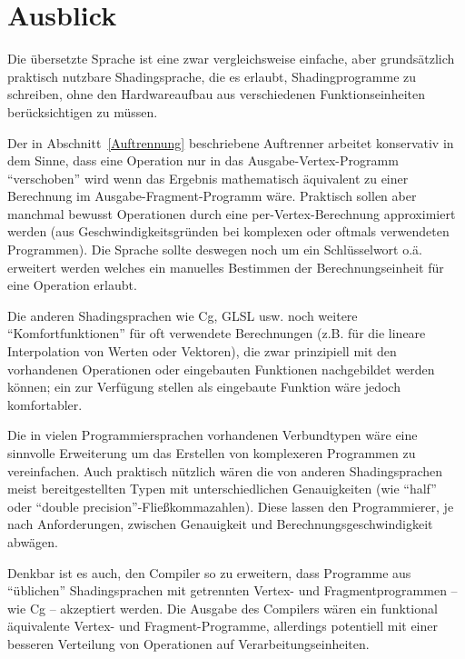 \documentclass[twoside,a4paper,fleqn,12pt]{book}
\begin{document}
\chapter{Ausblick}


Die übersetzte Sprache ist eine zwar vergleichsweise einfache, aber grundsätzlich praktisch nutzbare
Shadingsprache, die es erlaubt, Shadingprogramme zu schreiben, ohne den Hardwareaufbau aus verschiedenen Funktionseinheiten
berücksichtigen zu müssen.

Der in Abschnitt~\ref{Auftrennung} beschriebene Auftrenner arbeitet konservativ in dem Sinne, dass eine Operation nur in das Ausgabe-Vertex-Programm
"`verschoben"' wird wenn das Ergebnis mathematisch äquivalent zu einer Berechnung im Ausgabe-Fragment-Programm wäre.
Praktisch sollen aber manchmal bewusst Operationen durch eine per-Vertex-Berechnung approximiert werden (aus Geschwindigkeitsgründen
bei komplexen oder oftmals verwendeten Programmen). Die Sprache sollte deswegen noch um ein Schlüsselwort o.ä. erweitert werden
welches ein manuelles Bestimmen der Berechnungseinheit für eine Operation erlaubt.

Die anderen Shadingsprachen wie Cg, GLSL usw. noch weitere "`Komfortfunktionen"' für oft verwendete
Berechnungen (z.B. für die lineare Interpolation von Werten oder Vektoren), die zwar prinzipiell mit den vorhandenen Operationen
oder eingebauten Funktionen nachgebildet werden können; ein zur Verfügung stellen als eingebaute Funktion wäre jedoch komfortabler.

Die in vielen Programmiersprachen vorhandenen Verbundtypen wäre eine sinnvolle Erweiterung 
um das Erstellen von komplexeren Programmen zu vereinfachen. Auch praktisch nützlich wären die von anderen Shadingsprachen meist bereitgestellten
Typen mit unterschiedlichen Genauigkeiten (wie ``half'' oder ``double precision''-Fließkommazahlen). Diese lassen den Programmierer, je nach Anforderungen,
zwischen Genauigkeit und Berechnungsgeschwindigkeit abwägen. 

Denkbar ist es auch, den Compiler so zu erweitern, dass Programme aus "`üblichen"' Shadingsprachen mit getrennten Vertex- und Fragmentprogrammen
-- wie Cg -- akzeptiert werden. Die Ausgabe des Compilers wären ein funktional äquivalente Vertex- und Fragment-Programme,
allerdings potentiell mit einer besseren Verteilung von Operationen auf Verarbeitungseinheiten.
\end{document}
